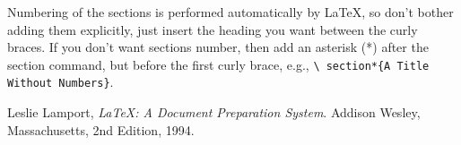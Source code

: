 \documentclass{article}
\begin{document}
Numbering of the sections is performed automatically by \LaTeX{}, so don't
bother adding them explicitly, just insert the heading you want between
the curly braces.  If you don't want sections number, then add an asterisk (*) after the
section command, but before the first curly brace, e.g., \texttt{\textbackslash
section*\{A Title Without Numbers\}}.
 
\begin{thebibliography}{9}
      Leslie Lamport,
      \emph{\LaTeX: A Document Preparation System}.
      Addison Wesley, Massachusetts,
      2nd Edition,
      1994.
 
\end{thebibliography} %
 
\end{document}

